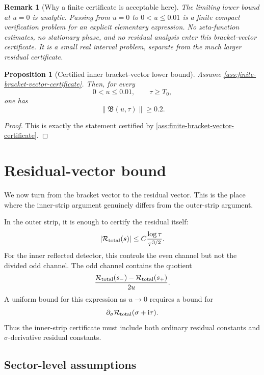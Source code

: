 \documentclass[11pt]{article}
\newtheorem{proposition}[theorem]{Proposition}
\newtheorem{remark}[theorem]{Remark}
\newcommand{\ii}{\mathrm{i}}
\newcommand{\Rtot}{\mathcal R_{\rm total}}
\newcommand{\Bvec}{\mathfrak B}
\begin{document}
\begin{remark}[Why a finite certificate is acceptable here]
The limiting lower bound at \(u=0\) is analytic.  Passing from \(u=0\) to
\(0<u\le0.01\) is a finite compact verification problem for an explicit
elementary expression.  No zeta-function estimates, no stationary phase, and
no residual analysis enter this bracket-vector certificate.  It is a small
real interval problem, separate from the much larger residual certificate.
\end{remark}

\begin{proposition}[Certified inner bracket-vector lower bound]
\label{prop:certified-inner-bracket-vector}
Assume \cref{ass:finite-bracket-vector-certificate}.  Then, for every
\[
        0<u\le0.01,
        \qquad
        \tau\ge T_0,
\]
one has
\[
        \|\Bvec(u,\tau)\|\ge0.2.
\]
\end{proposition}

\begin{proof}
This is exactly the statement certified by
\cref{ass:finite-bracket-vector-certificate}.
\end{proof}



\section{Residual-vector bound}
\label{sec:residual-vector}

We now turn from the bracket vector to the residual vector.  This is the place
where the inner-strip argument genuinely differs from the outer-strip
argument.

In the outer strip, it is enough to certify the residual itself:
\[
        |\Rtot(s)|
        \le
        C
        \frac{\log\tau}{\tau^{3/2}}.
\]
For the inner reflected detector, this controls the even channel but not the
divided odd channel.  The odd channel contains the quotient
\[
        \frac{\Rtot(s_-)-\Rtot(s_+)}{2u}.
\]
A uniform bound for this expression as \(u\to0\) requires a bound for
\[
        \partial_\sigma\Rtot(\sigma+\ii\tau).
\]
Thus the inner-strip certificate must include both ordinary residual constants
and \(\sigma\)-derivative residual constants.

\subsection{Sector-level assumptions}
\end{document}

